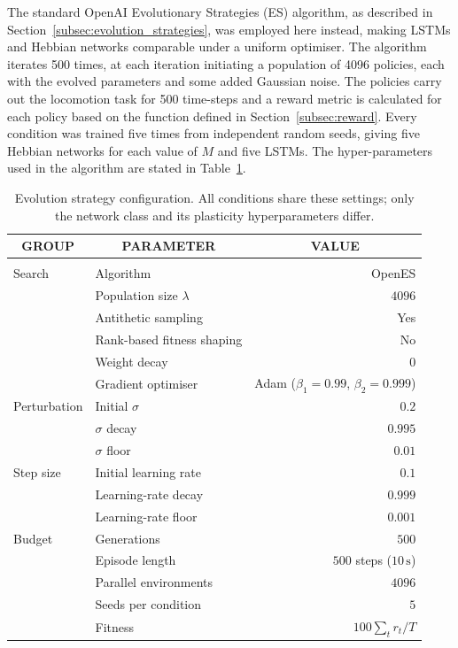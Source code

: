 \documentclass{article} %
\begin{document}
The standard OpenAI Evolutionary Strategies (ES) algorithm, as described in Section~\ref{subsec:evolution_strategies}, was employed here instead, making LSTMs and Hebbian networks comparable under a uniform optimiser. The algorithm iterates 500 times, at each iteration initiating a population of 4096 policies, each with the evolved parameters and
some added Gaussian noise. The policies carry out the locomotion task for 500
time-steps and a reward metric is calculated for each policy based on the function defined in Section~\ref{subsec:reward}. Every condition was trained five times from independent random seeds, giving five Hebbian networks for each value of $M$ and five LSTMs.
The hyper-parameters used in the algorithm are stated in Table~\ref{tab:es-params}.

\begin{table}[h]
\caption{Evolution strategy configuration. All conditions share these
settings; only the network class and its plasticity hyperparameters differ.}
\label{tab:es-params}
\begin{center}
\begin{tabular}{llr}
\multicolumn{1}{c}{\bf GROUP} & \multicolumn{1}{c}{\bf PARAMETER}
& \multicolumn{1}{c}{\bf VALUE} \\
\hline \\
Search        & Algorithm & OpenES \\
              & Population size $\lambda$ & $4096$ \\
              & Antithetic sampling & Yes \\
              & Rank-based fitness shaping & No \\
              & Weight decay & $0$ \\
              & Gradient optimiser & Adam ($\beta_1 = 0.99$, $\beta_2 = 0.999$) \\
[0.5em]
Perturbation  & Initial $\sigma$ & $0.2$ \\
              & $\sigma$ decay & $0.995$ \\
              & $\sigma$ floor & $0.01$ \\
[0.5em]
Step size     & Initial learning rate & $0.1$ \\
              & Learning-rate decay & $0.999$ \\
              & Learning-rate floor & $0.001$ \\
[0.5em]
Budget        & Generations & $500$ \\
              & Episode length & $500$ steps ($10\,\mathrm{s}$) \\
              & Parallel environments & $4096$ \\
              & Seeds per condition & $5$ \\
              & Fitness & $100 \sum_t r_t / T$ \\
[0.5em]
\end{tabular}
\end{center}
\end{table}
\end{document}
